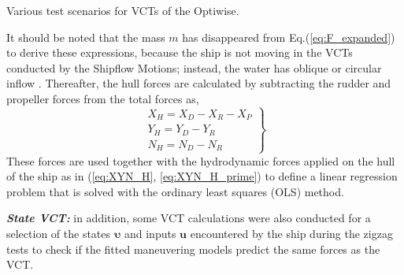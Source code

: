 \begin{table}[H]
    \centering
    \scriptsize
    \caption{Various test scenarios for VCTs of the Optiwise.}
    \label{tab:VCT_optiwise}
\end{table}
%    




It should be noted that the mass $m$ has disappeared from Eq.(\ref{eq:F_expanded}) to derive these expressions, because the ship is not moving in the VCTs conducted by the Shipflow Motions; instead, the water has oblique or circular inflow \citep{roychoudhuryCFDSimulationsSteady2017}.
Thereafter, the hull forces are calculated by subtracting the rudder and propeller forces from the total forces as,
\begin{equation}
    \label{eq:X_H_VCT}
    \left.\begin{aligned}
    X_H = X_D - X_R - X_P \\
    Y_H = Y_D - Y_R \\
    N_H = N_D - N_R
    \end{aligned}\right\}
\end{equation}
These forces are used together with the hydrodynamic forces applied on the hull of the ship as in (\autoref{eq:XYN_H}, \autoref{eq:XYN_H_prime}) to define a linear regression problem that is solved with the ordinary least squares (OLS) method.

\textbf{\textit{State VCT:}} in addition, some VCT calculations were also conducted for a selection of the states $\pmb{\bm{\upsilon}}$ and inputs $\mathbf{u}$ encountered by the ship during the zigzag tests to check if the fitted maneuvering models predict the same forces as the VCT.